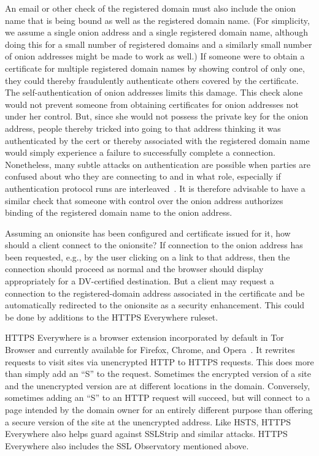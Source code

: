 \documentclass[10pt, conference, compsocconf]{styles/IEEEtran}
\begin{document}
An email or other check of the registered domain must also include the
onion name that is being bound as well as the registered domain name.
(For simplicity, we assume a single onion address and a single
registered domain name, although doing this for a small number of
registered domains and a similarly small number of onion addresses
might be made to work as well.)
If someone were to obtain a certificate for multiple registered domain
names by showing control of only one, they could thereby fraudulently
authenticate others covered by the certificate. The
self-authentication of onion addresses limits this damage.  This check
alone would not prevent someone from obtaining certificates for onion
addresses not under her control. But, since she would not possess the
private key for the onion address, people thereby tricked into going
to that address thinking it was authenticated by the cert or thereby
associated with the registered domain name would simply experience a
failure to successfully complete a connection. Nonetheless, many
subtle attacks on authentication are possible when parties are
confused about who they are connecting to and in what role, especially
if authentication protocol runs are interleaved~\cite{fosad00}.  It is
therefore advisable to have a similar check that someone with control
over the onion address authorizes binding of the registered domain
name to the onion address.



Assuming an onionsite has been configured and certificate issued for
it, how should a client connect to the onionsite? If connection
to the onion address has been requested, e.g., by the user
clicking on a link to that address, then the connection should
proceed as normal and the browser should display appropriately for a
DV-certified destination. But a client may request a connection
to the registered-domain address associated in the certificate
and be automatically redirected to the onionsite as a security
enhancement. This could be done by additions to the HTTPS Everywhere
ruleset.

HTTPS Everywhere is a browser extension incorporated by default in Tor
Browser and currently available for Firefox, Chrome, and
Opera~\cite{https-everywhere}. It rewrites requests to visit sites via
unencrypted HTTP to HTTPS requests. This does more than simply add an
``S'' to the request. Sometimes the encrypted version of a site and
the unencrypted version are at different locations in the domain.
Conversely, sometimes adding an ``S'' to an HTTP request will
succeed, but will connect to a page intended by the domain owner for an
entirely different purpose than offering a secure version of the site
at the unencrypted address.  Like HSTS, HTTPS Everywhere also helps
guard against SSLStrip and similar attacks. HTTPS Everywhere
also includes the SSL Observatory mentioned above.
\end{document}
